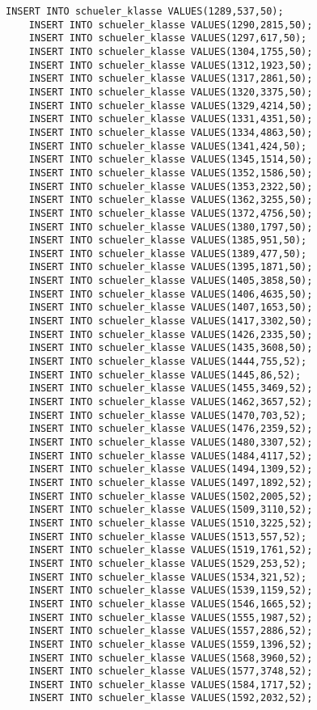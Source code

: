 \begin{lstlisting}[breaklines=True, numbers=none, basicstyle=\tiny, keepspaces=false]
	INSERT INTO schueler_klasse VALUES(1289,537,50);
	INSERT INTO schueler_klasse VALUES(1290,2815,50);
	INSERT INTO schueler_klasse VALUES(1297,617,50);
	INSERT INTO schueler_klasse VALUES(1304,1755,50);
	INSERT INTO schueler_klasse VALUES(1312,1923,50);
	INSERT INTO schueler_klasse VALUES(1317,2861,50);
	INSERT INTO schueler_klasse VALUES(1320,3375,50);
	INSERT INTO schueler_klasse VALUES(1329,4214,50);
	INSERT INTO schueler_klasse VALUES(1331,4351,50);
	INSERT INTO schueler_klasse VALUES(1334,4863,50);
	INSERT INTO schueler_klasse VALUES(1341,424,50);
	INSERT INTO schueler_klasse VALUES(1345,1514,50);
	INSERT INTO schueler_klasse VALUES(1352,1586,50);
	INSERT INTO schueler_klasse VALUES(1353,2322,50);
	INSERT INTO schueler_klasse VALUES(1362,3255,50);
	INSERT INTO schueler_klasse VALUES(1372,4756,50);
	INSERT INTO schueler_klasse VALUES(1380,1797,50);
	INSERT INTO schueler_klasse VALUES(1385,951,50);
	INSERT INTO schueler_klasse VALUES(1389,477,50);
	INSERT INTO schueler_klasse VALUES(1395,1871,50);
	INSERT INTO schueler_klasse VALUES(1405,3858,50);
	INSERT INTO schueler_klasse VALUES(1406,4635,50);
	INSERT INTO schueler_klasse VALUES(1407,1653,50);
	INSERT INTO schueler_klasse VALUES(1417,3302,50);
	INSERT INTO schueler_klasse VALUES(1426,2335,50);
	INSERT INTO schueler_klasse VALUES(1435,3608,50);
	INSERT INTO schueler_klasse VALUES(1444,755,52);
	INSERT INTO schueler_klasse VALUES(1445,86,52);
	INSERT INTO schueler_klasse VALUES(1455,3469,52);
	INSERT INTO schueler_klasse VALUES(1462,3657,52);
	INSERT INTO schueler_klasse VALUES(1470,703,52);
	INSERT INTO schueler_klasse VALUES(1476,2359,52);
	INSERT INTO schueler_klasse VALUES(1480,3307,52);
	INSERT INTO schueler_klasse VALUES(1484,4117,52);
	INSERT INTO schueler_klasse VALUES(1494,1309,52);
	INSERT INTO schueler_klasse VALUES(1497,1892,52);
	INSERT INTO schueler_klasse VALUES(1502,2005,52);
	INSERT INTO schueler_klasse VALUES(1509,3110,52);
	INSERT INTO schueler_klasse VALUES(1510,3225,52);
	INSERT INTO schueler_klasse VALUES(1513,557,52);
	INSERT INTO schueler_klasse VALUES(1519,1761,52);
	INSERT INTO schueler_klasse VALUES(1529,253,52);
	INSERT INTO schueler_klasse VALUES(1534,321,52);
	INSERT INTO schueler_klasse VALUES(1539,1159,52);
	INSERT INTO schueler_klasse VALUES(1546,1665,52);
	INSERT INTO schueler_klasse VALUES(1555,1987,52);
	INSERT INTO schueler_klasse VALUES(1557,2886,52);
	INSERT INTO schueler_klasse VALUES(1559,1396,52);
	INSERT INTO schueler_klasse VALUES(1568,3960,52);
	INSERT INTO schueler_klasse VALUES(1577,3748,52);
	INSERT INTO schueler_klasse VALUES(1584,1717,52);
	INSERT INTO schueler_klasse VALUES(1592,2032,52);

\end{lstlisting}
